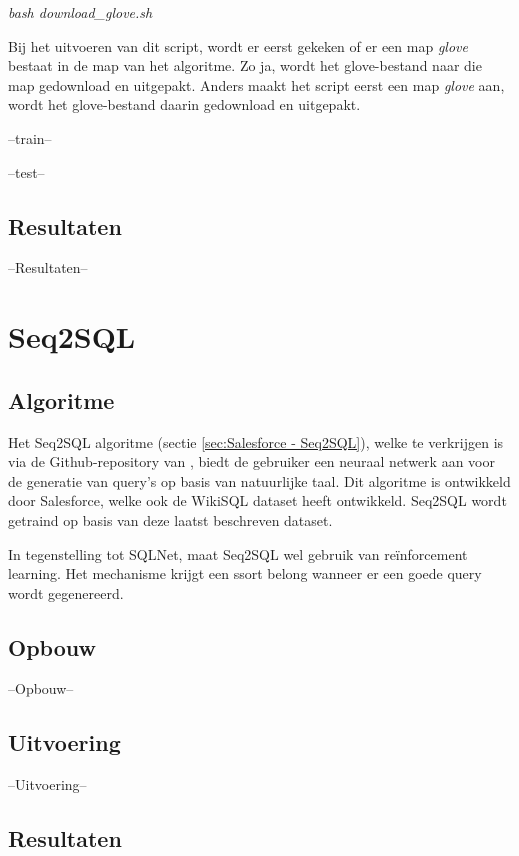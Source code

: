 \begin{center}
	\textit{bash download\_glove.sh}
\end{center}

Bij het uitvoeren van dit script, wordt er eerst gekeken of er een map \textit{glove} bestaat in de map van het algoritme. Zo ja, wordt het glove-bestand naar die map gedownload en uitgepakt. Anders maakt het script eerst een map \textit{glove} aan, wordt het glove-bestand daarin gedownload en uitgepakt. 

--train--

--test--

\subsection{Resultaten}

--Resultaten--

\section{Seq2SQL}

\subsection{Algoritme}

Het Seq2SQL algoritme (sectie \ref{sec:Salesforce - Seq2SQL}), welke te verkrijgen is via de Github-repository van \textcite{seq2sql}, biedt de gebruiker een neuraal netwerk aan voor de generatie van query's op basis van natuurlijke taal. Dit algoritme is ontwikkeld door Salesforce, welke ook de WikiSQL dataset heeft ontwikkeld. Seq2SQL wordt getraind op basis van deze laatst beschreven dataset.

In tegenstelling tot SQLNet, maat Seq2SQL wel gebruik van reïnforcement learning. Het mechanisme krijgt een ssort belong wanneer er een goede query wordt gegenereerd. 

\subsection{Opbouw}

--Opbouw--

\subsection{Uitvoering}

--Uitvoering--

\subsection{Resultaten}

